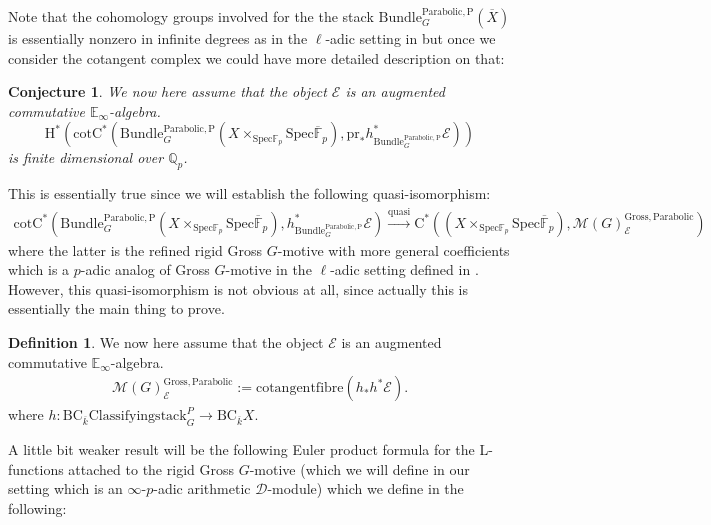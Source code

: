 \documentclass[11pt]{book}
\newtheorem{conjecture}[theorem]{Conjecture}
\theoremstyle{definition}
\newtheorem{definition}[theorem]{Definition}
\numberwithin{equation}{section}
\begin{document}
Note that the cohomology groups involved for the the stack $\mathrm{Bundle}^\mathrm{Parabolic,P}_G(\overline{X})$ is essentially nonzero in infinite degrees as in the $\ell$-adic setting in \cite{GL1} but once we consider the cotangent complex we could have more detailed description on that:

\begin{conjecture}
We now here assume that the object $\mathcal{E}$ is an augmented commutative $\mathbb{E}_\infty$-algebra.
\begin{displaymath}
\mathrm{H}^{*}(\mathrm{cot}\mathrm{C}^*(\mathrm{Bundle}^\mathrm{Parabolic,P}_G(X\times_{\mathrm{Spec}\mathbb{F}_p} \mathrm{Spec}\overline{\mathbb{F}}_p),\mathrm{pr}_*h_{\mathrm{Bundle}^\mathrm{Parabolic,P}_G}^*\mathcal{E}))
\end{displaymath}
is finite dimensional over $\mathbb{Q}_p$.
\end{conjecture}


This is essentially true since we will establish the following quasi-isomorphism:
\begin{align}
\mathrm{cot}\mathrm{C}^*(\mathrm{Bundle}^\mathrm{Parabolic,P}_G(X\times_{\mathrm{Spec}\mathbb{F}_p} \mathrm{Spec}\overline{\mathbb{F}}_p),h_{\mathrm{Bundle}^\mathrm{Parabolic,P}_G}^*\mathcal{E})\overset{\mathrm{quasi}}{\longrightarrow} \mathrm{C}^*((X\times_{\mathrm{Spec}\mathbb{F}_p} \mathrm{Spec}\overline{\mathbb{F}}_p),\mathcal{M}(G)^\mathrm{Gross,Parabolic}_\mathcal{E})
\end{align}
where the latter is the refined rigid Gross $G$-motive with more general coefficients which is a $p$-adic analog of Gross $G$-motive in the $\ell$-adic setting defined in \cite{Gro1}. However, this quasi-isomorphism is not obvious at all, since actually this is essentially the main thing to prove.

\begin{definition}
We now here assume that the object $\mathcal{E}$ is an augmented commutative $\mathbb{E}_\infty$-algebra.
\begin{align}
\mathcal{M}(G)^\mathrm{Gross,Parabolic}_\mathcal{E}:= \mathrm{cotangentfibre}(h_*h^*\mathcal{E}).	
\end{align}
where $h: \mathrm{BC}_{\overline{k}}\mathrm{Classifyingstack}^P_G \rightarrow \mathrm{BC}_{\overline{k}} X$.
\end{definition}


 A little bit weaker result will be the following Euler product formula for the L-functions attached to the rigid Gross $G$-motive (which we will define in our setting which is an $\infty$-$p$-adic arithmetic $\mathcal{D}$-module) which we define in the following:
\end{document}
